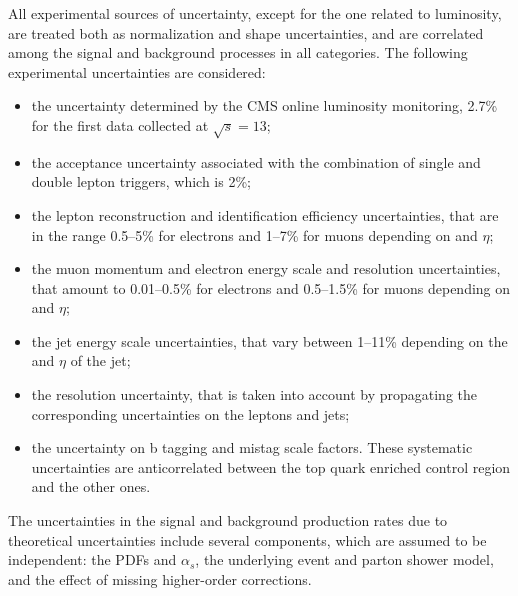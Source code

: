 All experimental sources of uncertainty, except for the one related to luminosity, are treated both as normalization and shape uncertainties, and are correlated among the signal and background processes in all categories. The following experimental uncertainties are considered:
\begin{itemize}
\item the uncertainty determined by the CMS online luminosity monitoring, 2.7\% for the first data collected at $\sqrt{s}=13$\TeV;
\item the acceptance uncertainty associated with the combination of single and double lepton triggers, which is 2\%;
\item the lepton reconstruction and identification efficiency uncertainties, that are in the range 0.5--5\% for electrons and 1--7\% for muons depending on \pt and $\eta$;
\item the muon momentum and electron energy scale and resolution uncertainties, that amount to 0.01--0.5\% for electrons and 0.5--1.5\% for muons depending on \pt and $\eta$;
\item the jet energy scale uncertainties, that vary between 1--11\% depending on the \pt and $\eta$ of the jet;
\item the \MET resolution uncertainty, that is taken into account by propagating the corresponding uncertainties on the leptons and jets;
\item the uncertainty on b tagging and mistag scale factors. These systematic uncertainties are anticorrelated between the top quark enriched control region and the other ones.
\end{itemize}

The uncertainties in the signal and background production rates due
to theoretical uncertainties include several components, which are assumed to be
independent: the PDFs and $\alpha_{s}$, the underlying event and parton shower model,
and the effect of missing higher-order corrections.

